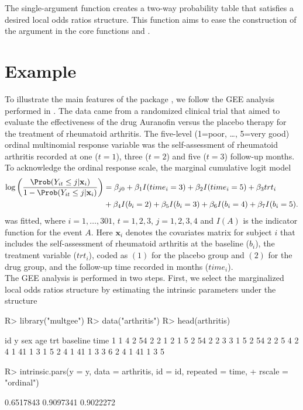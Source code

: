 \documentclass[article,shortnames,nojss]{jss}
\begin{document}
The single-argument function  creates a two-way probability table that satisfies a desired local odds ratios structure. This function aims to ease the construction of the  argument in the core functions  and .

\section{Example}\label{Example}
To illustrate the main features of the package , we follow the GEE analysis performed in \cite{Touloumis2012}. The data came from a randomized clinical trial \citep{Lipsitz1994} that aimed to evaluate the effectiveness of the drug Auranofin versus the placebo therapy for the treatment of rheumatoid arthritis. The five-level (1=poor, \ldots, 5=very good) ordinal multinomial response variable was the self-assessment of rheumatoid arthritis recorded at one ($t=1$), three ($t=2$) and five ($t=3$) follow-up months. To acknowledge the ordinal response scale, the marginal cumulative logit model 
\begin{align}
\log \left(\frac{\Prob(Y_{it}\leq j|\mathbf x_i)}{1-\Prob(Y_{it}\leq j|\mathbf x_i)}\right)&=\beta_{j0}+\beta_1 I(time_i=3)+\beta_2 I(time_i=5) +\beta_3 trt_i   \nonumber\\ 
                                                     &+\beta_4 I(b_i=2)+\beta_5 I(b_i=3)+\beta_6 I(b_i=4)+\beta_7 I(b_i=5).
\label{MarginalModelData}
\end{align} 
was fitted, where $i=1,\ldots,301$, $t=1,2,3$, $j=1,2,3,4$ and $I(A)$ is the indicator function for the event $A$. Here $\mathbf x_i$ denotes the covariates matrix for subject $i$ that includes the self-assessment of rheumatoid arthritis at the baseline ($b_i$), the treatment variable ($trt_i$), coded as $(1)$ for the placebo group and $(2)$ for the drug group, and the follow-up time recorded in months ($time_i$).\\
The GEE analysis is performed in two steps. First, we select the marginalized local odds ratios structure by estimating the intrinsic parameters under the  structure

\begin{Schunk}
\begin{Sinput}
R> library("multgee")
R> data("arthritis")
R> head(arthritis)
\end{Sinput}
\begin{Soutput}
  id y sex age trt baseline time
1  1 4   2  54   2        2    1
2  1 5   2  54   2        2    3
3  1 5   2  54   2        2    5
4  2 4   1  41   1        3    1
5  2 4   1  41   1        3    3
6  2 4   1  41   1        3    5
\end{Soutput}
\begin{Sinput}
R> intrinsic.pars(y = y, data = arthritis, id = id, repeated = time,
+                     rscale = "ordinal")
\end{Sinput}
\begin{Soutput}
[1] 0.6517843 0.9097341 0.9022272
\end{Soutput}
\end{Schunk}
\end{document}
